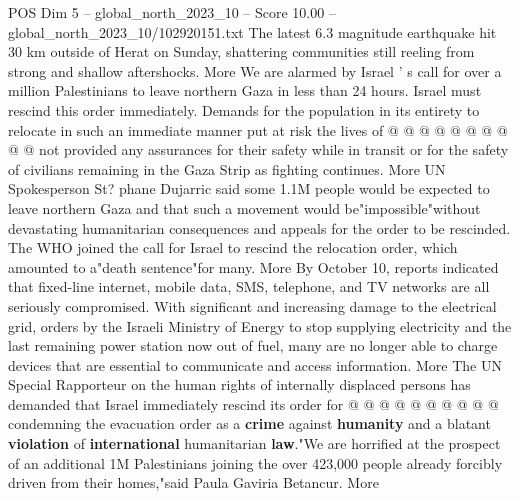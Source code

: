 \begin{textsample}{POS Dim 5 – global\_north\_2023\_10 – Score 10.00 – global\_north\_2023\_10/102920151.txt}
The latest 6.3 magnitude earthquake hit 30 km outside of Herat on Sunday, shattering communities still reeling from strong and shallow aftershocks.
More We are alarmed by Israel ' s call for over a million Palestinians to leave northern Gaza in less than 24 hours.
Israel must rescind this order immediately.
Demands for the population in its entirety to relocate in such an immediate manner put at risk the lives of @ @ @ @ @ @ @ @ @ @ not provided any assurances for their safety while in transit or for the safety of civilians remaining in the Gaza Strip as fighting continues.
More UN Spokesperson St? phane Dujarric said some 1.1M people would be expected to leave northern Gaza and that such a movement would be"impossible"without devastating humanitarian consequences and appeals for the order to be rescinded.
The WHO joined the call for Israel to rescind the relocation order, which amounted to a"death sentence"for many.
More By October 10, reports indicated that fixed-line internet, mobile data, SMS, telephone, and TV networks are all seriously compromised.
With significant and increasing damage to the electrical grid, orders by the Israeli Ministry of Energy to stop supplying electricity and the last remaining power station now out of fuel, many are no longer able to charge devices that are essential to communicate and access information.
More The UN Special Rapporteur on the human rights of internally displaced persons has demanded that Israel immediately rescind its order for @ @ @ @ @ @ @ @ @ @ condemning the evacuation order as a \textbf{crime} against \textbf{humanity} and a blatant \textbf{violation} of \textbf{international} humanitarian \textbf{law}."We are horrified at the prospect of an additional 1M Palestinians joining the over 423,000 people already forcibly driven from their homes,"said Paula Gaviria Betancur.
More

\end{textsample}
